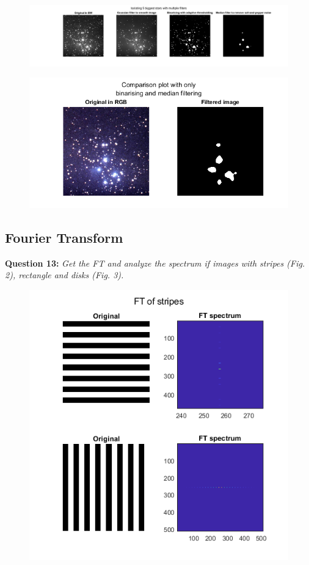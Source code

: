 \begin{figure}[H]
    \centering
    \includegraphics[width=\linewidth]{Doc/Graphics/Part1/Q12a.png}
\end{figure}

\begin{figure}[H]
    \centering
    \includegraphics[width=0.5\linewidth]{Doc/Graphics/Part1/Q12b.png}
\end{figure}


\subsection{Fourier Transform}
\textbf{Question 13:}
\textit{Get the FT and analyze the spectrum if images with stripes (Fig. 2), rectangle and disks (Fig. 3).}


\begin{figure}[H]
    \centering
    \includegraphics[width=0.75\linewidth]{Doc/Graphics/Part1/part1_Question13b.png}
\end{figure}


